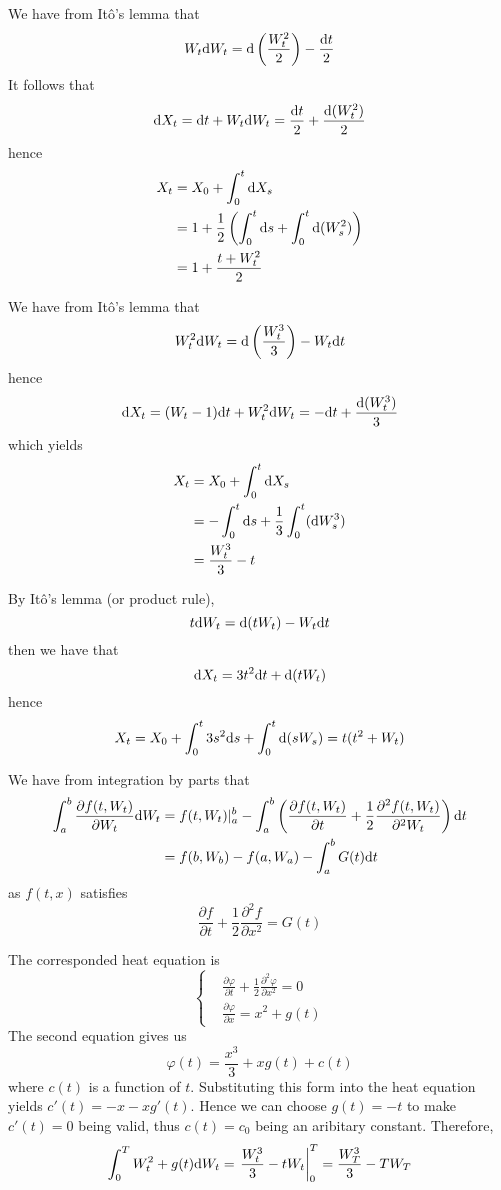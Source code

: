 \documentclass{homework}
\begin{document}
    \problem
    \begin{subproblem}[(\alph*)]
        \item
        We have from It\^o's lemma that
        \[W_t\mathrm d W_t=\mathrm d\left(\frac{W_t^2}{2}\right)-\frac{\mathrm d t}{2}\]
        It follows that
        \[\mathrm d X_t=\mathrm d t+W_t\mathrm d W_t=\frac{\mathrm d t}{2}+\frac{\mathrm d (W_t^2)}{2}\]
        hence
        \[\begin{aligned}
            X_t&=X_0+\int_0^t\mathrm d X_s\\
            &=1+\frac{1}{2}\left(\int_0^t\mathrm d s+\int_0^t\mathrm d(W_s^2)\right)\\
            &=1+\frac{t+W_t^2}{2}
        \end{aligned}\]

        \item
        We have from It\^o's lemma that
        \[W_t^2\mathrm d W_t=\mathrm d\left(\frac{W_t^3}{3}\right)-W_t\mathrm d t\]
        hence
        \[\mathrm d X_t=(W_t-1)\mathrm d t+W_t^2\mathrm d W_t=-\mathrm d t+\frac{\mathrm d(W_t^3)}{3}\]
        which yields
        \[\begin{aligned}
            X_t&=X_0+\int_0^t\mathrm d X_s\\
            &=-\int_0^t\mathrm d s+\frac{1}{3}\int_0^t(\mathrm d W_s^3)\\
            &=\frac{W_t^3}{3}-t
        \end{aligned}\]

        \item
        By It\^o's lemma (or product rule),
        \[t\mathrm d W_t=\mathrm d(tW_t)-W_t\mathrm d t\]
        then we have that
        \[\mathrm d X_t=3t^2\mathrm d t+\mathrm d(tW_t)\]
        hence
        \[X_t=X_0+\int_0^t3s^2\mathrm d s+\int_0^t\mathrm d (sW_s)=t(t^2+W_t)\]
    \end{subproblem}

    \problem
    We have from integration by parts that
    \[\begin{aligned}
        \int_a^b\frac{\partial f(t,W_t)}{\partial W_t}\mathrm d W_t
        &=f(t,W_t)|_a^b
        -\int_a^b\left(\frac{\partial f(t,W_t)}{\partial t}
        +\frac{1}{2}\frac{\partial^2 f(t,W_t)}{\partial^2 W_t}\right)
        \mathrm d t\\
        &=f(b,W_b)-f(a,W_a)-\int_a^bG(t)\mathrm d t
    \end{aligned}\]
    as $f(t,x)$ satisfies
    \[\frac{\partial f}{\partial t}+\frac{1}{2}\frac{\partial^2 f}{\partial x^2}=G(t)\]

    \problem
    The corresponded heat equation is
    \[\left\{\begin{aligned}
        &\frac{\partial\varphi}{\partial t}
        +\frac{1}{2}\frac{\partial^2\varphi}{\partial x^2}=0\\
        &\frac{\partial\varphi}{\partial x}=x^2+g(t)
    \end{aligned}\right.\]
    The second equation gives us
    \[\varphi(t)=\frac{x^3}{3}+xg(t)+c(t)\]
    where $c(t)$ is a function of $t$. Substituting this form into
    the heat equation yields $c'(t)=-x-xg'(t)$. Hence we can choose
    $g(t)=-t$ to make $c'(t)=0$ being valid, thus $c(t)=c_0$ being an aribitary
    constant. Therefore,
    \[\int_0^TW_t^2+g(t)\mathrm d W_t=\left.\frac{W_t^3}{3}-tW_t\right|_0^T
    =\frac{W_T^3}{3}-TW_T\]
\end{document}
